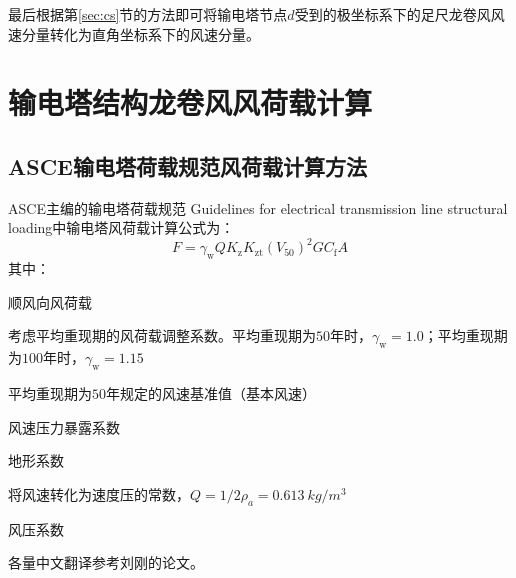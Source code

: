 最后根据第\ref{sec:cs}节的方法即可将输电塔节点$d$受到的极坐标系下的足尺龙卷风风速分量转化为直角坐标系下的风速分量。


\section{输电塔结构龙卷风风荷载计算}

\subsection{ASCE输电塔荷载规范风荷载计算方法}
ASCE主编的输电塔荷载规范 Guidelines for electrical transmission line structural loading\cite{wong2009guidelines}中输电塔风荷载计算公式为：
\begin{equation}
F = \gamma_{\mathrm{w}} Q K_{\mathrm{z}} K_{\mathrm{zt}} \left( V_{50}\right)^2 G C_{\mathrm{f}} A
\end{equation}
其中：
\begin{description}[leftmargin=!,labelwidth=2em]
\item[$F$] 顺风向风荷载
\item[$\gamma_{\mathrm{w}}$] 考虑平均重现期的风荷载调整系数。平均重现期为$50$年时，$\gamma_{\mathrm{w}}=1.0$；平均重现期为$100$年时，$\gamma_{\mathrm{w}}=1.15$
\item[$V_{50}$] 平均重现期为$50$年规定的风速基准值（基本风速）
\item[$K_{\mathrm{z}}$] 风速压力暴露系数
\item[$K_{\mathrm{zt}}$] 地形系数
\item[$Q$] 将风速转化为速度压的常数，$Q=1/2 \rho_a=\SI{0.613}{kg/m^3}$
\item[$C_{\mathrm{f}}$] 风压系数
\end{description}
各量中文翻译参考刘刚的论文\cite{liu2010wind}。


